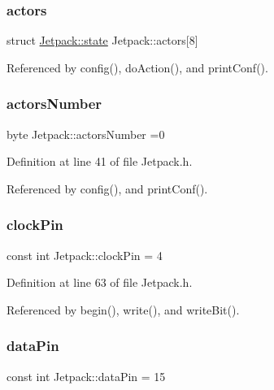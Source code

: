 \subsubsection{\texorpdfstring{actors}{actors}}
{\footnotesize\ttfamily struct \hyperlink{structJetpack_1_1state}{Jetpack\+::state} Jetpack\+::actors\mbox{[}8\mbox{]}\hspace{0.3cm}{\ttfamily [private]}}



Referenced by config(), do\+Action(), and print\+Conf().

\mbox{\label{classJetpack_a52c86319cb3f7f1ab744a64db18a7ba5}} 
\subsubsection{\texorpdfstring{actors\+Number}{actorsNumber}}
{\footnotesize\ttfamily byte Jetpack\+::actors\+Number =0\hspace{0.3cm}{\ttfamily [private]}}



Definition at line 41 of file Jetpack.\+h.



Referenced by config(), and print\+Conf().

\mbox{\label{classJetpack_a58ebb991f358f3ae94e82148b0221b5a}} 
\subsubsection{\texorpdfstring{clock\+Pin}{clockPin}}
{\footnotesize\ttfamily const int Jetpack\+::clock\+Pin = 4\hspace{0.3cm}{\ttfamily [private]}}



Definition at line 63 of file Jetpack.\+h.



Referenced by begin(), write(), and write\+Bit().

\mbox{\label{classJetpack_a3d669a56e93c71dd25f970d4ed7d0c00}} 
\subsubsection{\texorpdfstring{data\+Pin}{dataPin}}
{\footnotesize\ttfamily const int Jetpack\+::data\+Pin = 15\hspace{0.3cm}{\ttfamily [private]}}



